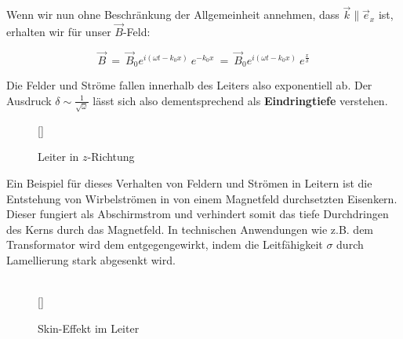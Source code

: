 \newpage
Wenn wir nun ohne Beschränkung der Allgemeinheit annehmen, dass $\vec{k}\parallel\vec{e}_x$ ist, erhalten wir für unser $\vec{B}$-Feld:

\begin{equation*}
\vec{B} \ = \ \vec{B}_0 e^{i(\omega t-k_0 x)} \ e^{-k_0 x}  \ = \  \vec{B}_0 e^{i(\omega t-k_0 x)} \ e^{\frac{x}{\delta}}
\end{equation*}

Die Felder und Ströme fallen innerhalb des Leiters also exponentiell ab. Der Ausdruck $\delta\sim \frac{1}{\sqrt{\omega}}$ lässt sich also dementsprechend als \textbf{Eindringtiefe} verstehen.

\begin{wrapfigure}[]{l}[0cm]{0cm}
	\raisebox{0pt}[\dimexpr{}\baselineskip\relax]{
		\colorbox{hgrey}{
		}
}
	\caption{Leiter in $z$-Richtung}
\end{wrapfigure}

Ein Beispiel für dieses Verhalten von Feldern und Strömen in Leitern ist die Entstehung von Wirbelströmen in von einem Magnetfeld durchsetzten Eisenkern. Dieser fungiert als Abschirmstrom und verhindert somit das tiefe Durchdringen des Kerns durch das Magnetfeld. In technischen Anwendungen wie z.B. dem Transformator wird dem entgegengewirkt, indem die Leitfähigkeit $\sigma$ durch Lamellierung stark abgesenkt wird.\\
\ \\ \linebreak

\begin{wrapfigure}[]{r}[0cm]{0cm}
	\raisebox{0pt}[\dimexpr{}\baselineskip\relax]{
		\colorbox{hgrey}{
		}
	}
	\caption{Skin-Effekt im Leiter}
\end{wrapfigure}

